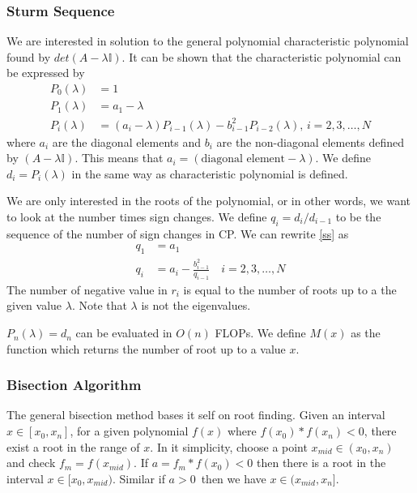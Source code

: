 \documentclass[%
reprint,
nofootinbib,
amsmath,amssymb,
aps,
]{revtex4-1}
\begin{document}
\subsubsection{Sturm Sequence}
We are interested in solution to the general polynomial characteristic polynomial found by $det(A - \lambda \mathbb{I})$. It can be shown \cite{datta2010numerical} that the characteristic polynomial can be expressed by 
\begin{equation}\label{ss}
	\begin{split}
		P_0(\lambda) &= 1\\
		P_1(\lambda) &= a_1 - \lambda\\
		P_i(\lambda) &= (a_i-\lambda)P_{i-1}(\lambda) - b_{i-1}^2P_{i-2}(\lambda),\,i = 2,3,\dots,N
	\end{split}
\end{equation}
where $a_{i}$ are the diagonal elements and $b_i$ are the non-diagonal elements defined by $(A - \lambda \mathbb{I})$. This means that $a_{i} = (\text{diagonal element} - \lambda)$. We define $d_i = P_i(\lambda)$ in the same way as characteristic polynomial is defined. 

We are only interested in the roots of the polynomial, or in other words, we want to look at the number times sign changes\cite{AlbrechtCE09}. We define $q_i = d_i/d_{i-1}$ to be the sequence of the number of sign changes in CP. We can rewrite \ref{ss} as 
\begin{equation}
	\begin{split}
		q_1 &= a_1 \\ 
		q_i &= a_i - \frac{b_{i-1}^2}{q_{i-1}} \quad i = 2,3,\dots,N
	\end{split}
\end{equation}
The number of negative value in $r_i$ is equal to the number of roots up to a the given value $\lambda$. Note that $\lambda$ is not the eigenvalues. 

$P_n(\lambda) = d_n$ can be evaluated in $O(n)$ FLOPs. We define $M(x)$ as the function which returns the number of root up to a value $x$. 
\subsubsection{Bisection Algorithm}
The general bisection method bases it self on root finding. Given an interval $x\in[x_0,x_n]$, for a given polynomial $f(x)$ where $f(x_0)*f(x_n) < 0$, there exist a root in the range of $x$. In it simplicity, choose a point $x_{mid}\in (x_0,x_n)$ and check $f_m = f(x_{mid})$. If $a = f_m * f(x_0) < 0$ then there is a root in the interval $x\in [x_0, x_{mid})$. Similar if  $a>0$ then we have $x\in(x_{mid},x_n]$. 
\end{document}
